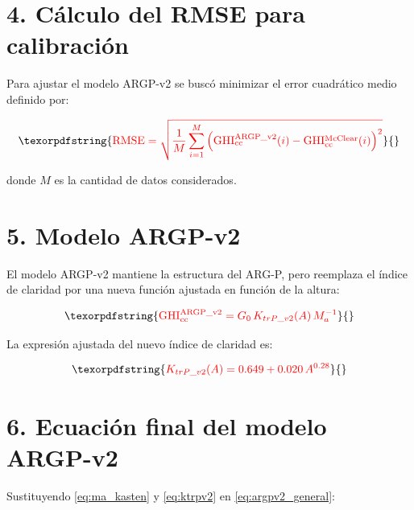 \documentclass[letterpaper,12pt, twoside]{report}
\providecommand{\DIFdeltex}[1]{{\protect\color{red} \scriptsize #1}} %
\providecommand{\DIFdel}[1]{\texorpdfstring{\DIFdeltex{#1}}{}} %
\begin{document}
\section*{\DIFdel{4. Cálculo del RMSE para calibración}}

\DIFdel{Para ajustar el modelo ARGP-v2 se buscó minimizar el error cuadrático medio definido por:
}%

\begin{displaymath}
\DIFdel{\mathrm{RMSE} = 
\sqrt{
\frac{1}{M}
\sum_{i=1}^{M}
\left(
\mathrm{GHI_{cc}^{ARGP\_v2}}(i)
-
\mathrm{GHI_{cc}^{McClear}}(i)
\right)^2
}
}\end{displaymath}%

\DIFdel{donde $M$ es la cantidad de datos considerados.
}%

\section*{\DIFdel{5. Modelo ARGP-v2}}

\DIFdel{El modelo ARGP-v2 mantiene la estructura del ARG-P, pero reemplaza el índice de claridad por una 
nueva función ajustada en función de la altura:
}%

\begin{displaymath}
\DIFdel{\mathrm{GHI_{cc}^{ARGP\_v2}} = 
G_0 \, K_{trP\_v2}(A)\, M_a^{-1}
\label{eq:argpv2_general}
}\end{displaymath}%

\DIFdel{La expresión ajustada del nuevo índice de claridad es:
}%

\begin{displaymath}
\DIFdel{K_{trP\_v2}(A) = 0.649 + 0.020\, A^{0.28}
}\end{displaymath}%

\section*{\DIFdel{6. Ecuación final del modelo ARGP-v2}}

\DIFdel{Sustituyendo \eqref{eq:ma_kasten} y \eqref{eq:ktrpv2} en \eqref{eq:argpv2_general}:
}%
\end{document}
